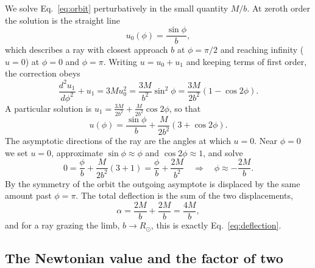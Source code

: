 \documentclass[10pt]{article}
\theoremstyle{definition}
\theoremstyle{remark}
\begin{document}
We solve Eq.~\eqref{eq:orbit} perturbatively in the small quantity $M/b$. At zeroth order the solution is the straight line
\begin{equation}
u_0(\phi) = \frac{\sin\phi}{b},
\end{equation}
which describes a ray with closest approach $b$ at $\phi = \pi/2$ and reaching infinity ($u=0$) at $\phi = 0$ and $\phi = \pi$. Writing $u = u_0 + u_1$ and keeping terms of first order, the correction obeys
\begin{equation}
\frac{d^2 u_1}{d\phi^2} + u_1 = 3M u_0^2 = \frac{3M}{b^2}\sin^2\phi = \frac{3M}{2b^2}\left(1 - \cos 2\phi\right).
\end{equation}
A particular solution is $u_1 = \frac{3M}{2b^2} + \frac{M}{2b^2}\cos 2\phi$, so that
\begin{equation}
u(\phi) = \frac{\sin\phi}{b} + \frac{M}{2b^2}\left(3 + \cos 2\phi\right).
\end{equation}
The asymptotic directions of the ray are the angles at which $u = 0$. Near $\phi = 0$ we set $u = 0$, approximate $\sin\phi \approx \phi$ and $\cos 2\phi \approx 1$, and solve
\begin{equation}
0 = \frac{\phi}{b} + \frac{M}{2b^2}(3+1) = \frac{\phi}{b} + \frac{2M}{b^2} \quad\Longrightarrow\quad \phi \approx -\frac{2M}{b}.
\end{equation}
By the symmetry of the orbit the outgoing asymptote is displaced by the same amount past $\phi = \pi$. The total deflection is the sum of the two displacements,
\begin{equation}
\alpha = \frac{2M}{b} + \frac{2M}{b} = \frac{4M}{b},
\end{equation}
and for a ray grazing the limb, $b \to R_\odot$, this is exactly Eq.~\eqref{eq:deflection}.




\subsection{The Newtonian value and the factor of two}
\end{document}
